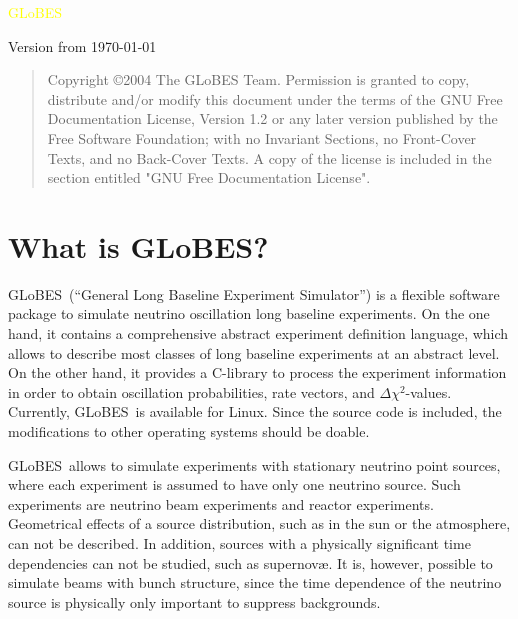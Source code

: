 \documentclass[a4paper,12pt,twoside]{book}
\newcommand{\GLOBES}{{\sf GLoBES}}
\begin{document}
{\begin{center}
\vspace*{-1cm}

{\Huge \textcolor{yellow}{GLoBES}}
\end{center}

\vspace{1cm}

\begin{center}
Version from \today
\end{center}



}

\clearpage
\thispagestyle{empty}
\bigskip
\begin{quote}
    Copyright \copyright  2004  The GLoBES Team.
    Permission is granted to copy, distribute and/or modify this document
    under the terms of the GNU Free Documentation License, Version 1.2
    or any later version published by the Free Software Foundation;
    with no Invariant Sections, no Front-Cover Texts, and no Back-Cover Texts.
    A copy of the license is included in the section entitled "GNU
    Free Documentation License".
\end{quote}
\bigskip
    


\cleardoublepage
\setcounter{page}{1}

\chapter*{What is \GLOBES ?}

\GLOBES\ (``General Long Baseline Experiment Simulator'') is a flexible
software package to simulate neutrino oscillation 
long baseline experiments. On the
one hand, it contains a comprehensive abstract experiment definition
language, which allows to describe most classes of long baseline experiments
at an abstract level. On the other hand, it provides a C-library to 
process the experiment information in order to obtain oscillation
probabilities, rate vectors, and $\Delta \chi^2$-values. Currently, 
\GLOBES\ is available for Linux. Since the source code is included,
the modifications to other operating systems should be doable.

\GLOBES\ allows to simulate experiments with stationary neutrino point sources, where each experiment is assumed to have only one neutrino source.
Such experiments are neutrino beam experiments and reactor experiments. 
Geometrical effects of a source distribution, such as in the sun or the 
atmosphere, can not be described. In addition, sources with a physically 
significant time dependencies  can not be studied, such as  supernov\ae. It 
is, however, possible to simulate beams with bunch structure, since the 
time dependence of the neutrino source is physically only important to suppress backgrounds. 
\end{document}

